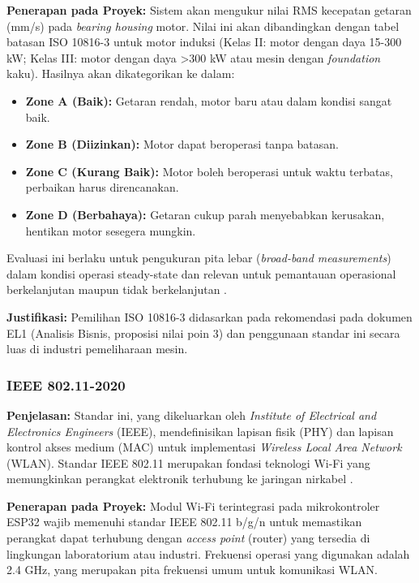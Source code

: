 \documentclass{elsinta}
\begin{document}
\textbf{Penerapan pada Proyek:} 
Sistem akan mengukur nilai RMS kecepatan getaran (mm/s) pada \textit{bearing housing} motor. Nilai ini akan dibandingkan dengan tabel batasan ISO 10816-3 untuk motor induksi (Kelas II: motor dengan daya 15-300 kW; Kelas III: motor dengan daya >300 kW atau mesin dengan \textit{foundation} kaku). Hasilnya akan dikategorikan ke dalam:
\begin{itemize}
    \item \textbf{Zone A (Baik):} Getaran rendah, motor baru atau dalam kondisi sangat baik.
    \item \textbf{Zone B (Diizinkan):} Motor dapat beroperasi tanpa batasan.
    \item \textbf{Zone C (Kurang Baik):} Motor boleh beroperasi untuk waktu terbatas, perbaikan harus direncanakan.
    \item \textbf{Zone D (Berbahaya):} Getaran cukup parah menyebabkan kerusakan, hentikan motor sesegera mungkin.
\end{itemize}
Evaluasi ini berlaku untuk pengukuran pita lebar (\textit{broad-band measurements}) dalam kondisi operasi steady-state dan relevan untuk pemantauan operasional berkelanjutan maupun tidak berkelanjutan \cite{iso10816_2009_bsi}.

\textbf{Justifikasi:} Pemilihan ISO 10816-3 didasarkan pada rekomendasi pada dokumen EL1 (Analisis Bisnis, proposisi nilai poin 3) dan penggunaan standar ini secara luas di industri pemeliharaan mesin.

\subsubsection{IEEE 802.11-2020}
\textbf{Penjelasan:} Standar ini, yang dikeluarkan oleh \textit{Institute of Electrical and Electronics Engineers} (IEEE), mendefinisikan lapisan fisik (PHY) dan lapisan kontrol akses medium (MAC) untuk implementasi \textit{Wireless Local Area Network} (WLAN). Standar IEEE 802.11 merupakan fondasi teknologi Wi-Fi yang memungkinkan perangkat elektronik terhubung ke jaringan nirkabel \cite{ieee80211_2020}.

\textbf{Penerapan pada Proyek:} Modul Wi-Fi terintegrasi pada mikrokontroler ESP32 wajib memenuhi standar IEEE 802.11 b/g/n untuk memastikan perangkat dapat terhubung dengan \textit{access point} (router) yang tersedia di lingkungan laboratorium atau industri. Frekuensi operasi yang digunakan adalah 2.4 GHz, yang merupakan pita frekuensi umum untuk komunikasi WLAN.
\end{document}
